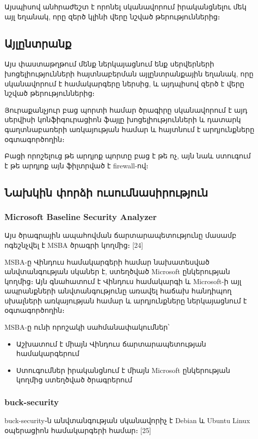 \documentclass[12pt]{article}
\begin{document}
\begin{sloppypar}
Այսպիսով անհրաժեշտ է որոնել սկանավորում իրականցնելու մեկ այլ եղանակ,
որը զերծ կլինի վերը նշված թերություններից։


\subsection{Այլընտրանք}


Այս փաստաթղթում մենք ներկայացնում ենք սերվերների խոցելիությունների
հայտնաբերման այլընտրանքային եղանակ, որը սկանավորում է համակարգերը
ներսից, և այդպիսով զերծ է վերը նշված թերություններից։

Յուրաքանչյուր բաց պորտի համար ծրագիրը սկանավորում է այդ սերվիսի
կոնֆիգուրացիոն ֆայլը խոցելիությունների և դատարկ գաղտնաբառերի
առկայության համար և հայտնում է արդյունքները օգտագործողին։

Բացի որոշելուց թե արդյոք պորտը բաց է թե ոչ, այն նաև ստուգում է
թե արդյոք այն ֆիլտրված է firewall-ով։


\subsection{Նախկին փորձի ուսումնասիրություն}


\subsubsection{Microsoft Baseline Security Analyzer}


Այս ծրագրային ապահովման ճարտարապետությունը մասամբ ոգեշնչվել է
MSBA ծրագրի կողմից։ [24]

MSBA-ը Վինդուս համակարգերի համար նախատեսված անվտանգության սկաներ է,
ստեղծված Microsoft ընկերության կողմից։ Այն գնահատում է Վինդուս
համակարգի և Microsoft-ի այլ ապրանքների անվտանգությունը առավել
հաճախ հանդիպող սխալների առկայության համար և արդյունքները 
ներկայացնում է օգտագործողին։

MSBA-ը ունի որոշակի սահմանափակումներ՝
\begin{itemize}
\item Աշխատում է միայն Վինդուս ճարտարապետության համակարգերում
\item Ստուգումներ իրականցնում է միայն Microsoft ընկերության
	կողմից ստեղծված ծրագրերում
\end{itemize}


\subsubsection{buck-security}


buck-security֊ն անվտանգության սկանավորիչ է Debian և Ubuntu Linux
օպերացիոն համակարգերի համար։ [25]


\end{sloppypar}
\end{document}
